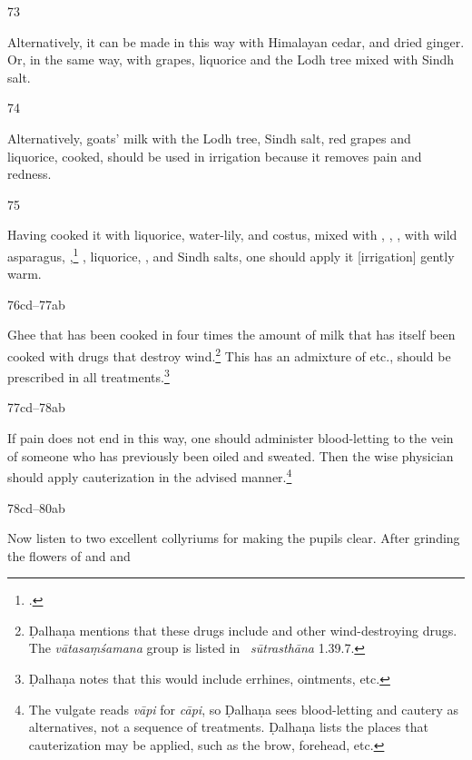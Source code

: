 \begin{translation}
    \item[73]
    
    Alternatively, it can be made in this way with Himalayan cedar,  and dried 
    ginger.
    Or, in the same way, with grapes, liquorice and the Lodh tree mixed with Sindh salt.
    
    \item[74]
    
    Alternatively, goats' milk with the Lodh tree, Sindh salt, red grapes and liquorice, cooked, 
    should be used in irrigation because it removes pain and redness. 
    
    \item[75]
    
    Having cooked it with liquorice, water-lily, and costus, mixed with ,
    ,
    , 
    with wild asparagus, ,\footcite[18]{suve-2000}
    ,
    liquorice,
    ,
    and Sindh salts, 
    one should apply it [irrigation] gently warm.
    
    
    \item[76cd--77ab]
    
    Ghee that has been cooked in four times the amount of milk that has itself
been cooked with drugs that destroy wind.\footnote{Ḍalhaṇa mentions that these
drugs include  and other wind-destroying drugs.  The
\emph{vātasaṃśamana} group is listed in \SS\ \emph{sūtrasthāna} 1.39.7.}
This has an admixture of  etc., should be
prescribed in all treatments.\footnote{Ḍalhaṇa notes that this would include
errhines, ointments, etc.}
    
    \item[77cd--78ab]
    
    If pain does not end in this way, one should administer blood-letting to the vein of 
    someone who has previously been oiled and sweated.  Then the wise physician should 
    apply cauterization in the advised manner.\footnote{The vulgate reads \emph{vāpi} for 
    \emph{cāpi}, so Ḍalhaṇa sees blood-letting and cautery as alternatives, not a sequence of 
    treatments.  Ḍalhaṇa lists the places that cauterization may be applied, such as  the brow, 
    forehead, etc.}
    
    \item[78cd--80ab]
    
    Now listen to two excellent collyriums for making the pupils clear.  
After grinding the flowers of  
and  and 
    

    
    
    
    \end{translation}
    
    
    
    